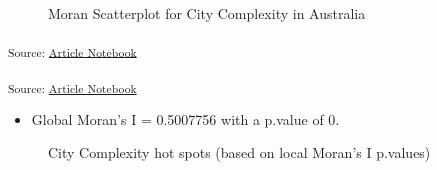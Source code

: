 \documentclass[
  number]{elsarticle}
\providecommand{\tightlist}{%
  \setlength{\itemsep}{0pt}\setlength{\parskip}{0pt}}\usepackage{longtable,booktabs,array}
\begin{document}
\label{cell-fig-moran-plot}
\begin{figure}[H]


\caption{\label{fig-moran-plot}Moran Scatterplot for City Complexity in
Australia}

\end{figure}%

\textsubscript{Source:
\href{https://aiti-flinders.github.io/sirp-complexity/index.qmd.html}{Article
Notebook}}

\textsubscript{Source:
\href{https://aiti-flinders.github.io/sirp-complexity/index.qmd.html}{Article
Notebook}}

\begin{itemize}
\tightlist
\item
  Global Moran's I = 0.5007756 with a p.value of 0.
\end{itemize}

\label{cell-fig-complexity-hot-spots}
\begin{figure}[H]


\caption{\label{fig-complexity-hot-spots}City Complexity hot spots
(based on local Moran's I p.values)}

\end{figure}%
\end{document}
